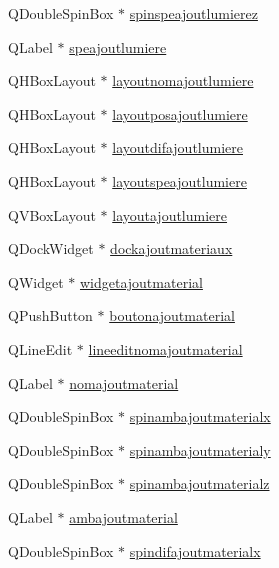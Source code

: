 \begin{DoxyCompactItemize}
\item 
Q\+Double\+Spin\+Box $\ast$ \hyperlink{class_main_window_a69368f55e2df16fac69b4bc9b7b24696}{spinspeajoutlumierez}
\item 
Q\+Label $\ast$ \hyperlink{class_main_window_a549c42dd7554a4414ca34fc253457889}{speajoutlumiere}
\item 
Q\+H\+Box\+Layout $\ast$ \hyperlink{class_main_window_a0cffcdf1b642b23f05b7ed78beaeb066}{layoutnomajoutlumiere}
\item 
Q\+H\+Box\+Layout $\ast$ \hyperlink{class_main_window_a0afe930901084cdb5835537298d77219}{layoutposajoutlumiere}
\item 
Q\+H\+Box\+Layout $\ast$ \hyperlink{class_main_window_a8ce502c6bd1f174f2e13d491f0797056}{layoutdifajoutlumiere}
\item 
Q\+H\+Box\+Layout $\ast$ \hyperlink{class_main_window_a31b82741cd4c48d8e3b85981173fd1ad}{layoutspeajoutlumiere}
\item 
Q\+V\+Box\+Layout $\ast$ \hyperlink{class_main_window_ab54462c9ca68986b780c8fb83300336c}{layoutajoutlumiere}
\item 
Q\+Dock\+Widget $\ast$ \hyperlink{class_main_window_a033d7bd189e33389081c3352c3b41021}{dockajoutmateriaux}
\item 
Q\+Widget $\ast$ \hyperlink{class_main_window_a071e7995e629a7b42ddbc5f54eae7dd3}{widgetajoutmaterial}
\item 
Q\+Push\+Button $\ast$ \hyperlink{class_main_window_a9d0608c267dd8f7898df41de4dda0be1}{boutonajoutmaterial}
\item 
Q\+Line\+Edit $\ast$ \hyperlink{class_main_window_a9f41187b00dba6b31cc4411bdc3e673b}{lineeditnomajoutmaterial}
\item 
Q\+Label $\ast$ \hyperlink{class_main_window_ae0e05e579231d8e870d07ba9e4ae7223}{nomajoutmaterial}
\item 
Q\+Double\+Spin\+Box $\ast$ \hyperlink{class_main_window_a307a29066af1090776251ddc1e067388}{spinambajoutmaterialx}
\item 
Q\+Double\+Spin\+Box $\ast$ \hyperlink{class_main_window_a5f6a9da53b2ff428ff4ebf5ec4d469ff}{spinambajoutmaterialy}
\item 
Q\+Double\+Spin\+Box $\ast$ \hyperlink{class_main_window_a6969ed6db37482077ffe51c2b00a4b82}{spinambajoutmaterialz}
\item 
Q\+Label $\ast$ \hyperlink{class_main_window_aea5950c7b756106a6a68c766352676bb}{ambajoutmaterial}
\item 
Q\+Double\+Spin\+Box $\ast$ \hyperlink{class_main_window_a350c852e60398b5e1d8923666a19f4a8}{spindifajoutmaterialx}

\end{DoxyCompactItemize}
